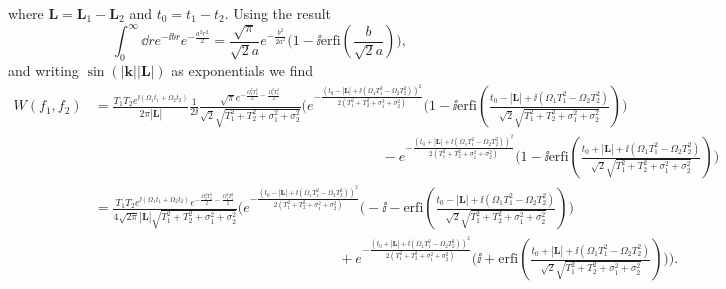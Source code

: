 where $\bm L = \bm L_1 - \bm L_2$ and $t_0 = t_1-t_2$. Using the result
\begin{equation}
    \int_0^\infty \dd r e^{- \ii b r}e^{- \frac{a^2r^2}{2}} = \frac{\sqrt{\pi}}{\sqrt{2}a}e^{- \frac{b^2}{2a^2}}\Big(1 - \ii \text{erfi}\left(\frac{b}{\sqrt{2}a}\right)\Big),
\end{equation}
and writing $\sin(|\bm k||\bm L|)$ as exponentials we find{\footnotesize
\begin{align}
     W(f_1,f_2) &= \frac{T_1T_2e^{\ii (\Omega_1 t_1+\Omega_2 t_2)}}{2\pi|\bm L|}  \frac{1}{2\ii}\frac{\sqrt{\pi}e^{- \frac{\Omega_2^2 T_2^2}{2} - \frac{\Omega_1^2 T_1^2}{2}}}{\sqrt{2} \sqrt{T_1^2 + T_2^2 + \sigma_1^2 + \sigma_2^2}}\Bigg(e^{- \frac{(t_0 - |\bm L|+\ii (\Omega_1 T_1^2- \Omega_2 T_2^2))^2}{2(T_1^2 + T_2^2 + \sigma_1^2 + \sigma_2^2)}}\Bigg(1 - \ii \text{erfi}\left(\tfrac{t_0 - |\bm L|+\ii (\Omega_1 T_1^2- \Omega_2 T_2^2)}{\sqrt{2}\sqrt{T_1^2 + T_2^2 + \sigma_1^2 + \sigma_2^2}}\right)\Bigg)\nonumber\\
     &\:\:\:\:\:\:\:\:\:\:\:\:\:\:\:\:\:\:\:\:\:\:\:\:\:\:\:\:\:\:\:\:\:\:\:\:\:\:\:\:\:\:\:\:\:\:\:\:\:\:\:\:\:\:\:\:\:\:\:\:\:\:\:\:\:\:\:\:\:\:\:\:\:\:\:\:\:\:\:\:\:\:\:\:\:\:\:\:\:\:\:\:\:-e^{- \frac{(t_0 + |\bm L|+\ii (\Omega_1 T_1^2- \Omega_2 T_2^2))^2}{2(T_1^2 + T_2^2 + \sigma_1^2 + \sigma_2^2)}}\Bigg(1 - \ii \text{erfi}\left(\tfrac{t_0 + |\bm L|+\ii (\Omega_1 T_1^2- \Omega_2 T_2^2)}{\sqrt{2}\sqrt{T_1^2 + T_2^2 + \sigma_1^2 + \sigma_2^2}}\right)\Bigg)\nonumber\\
     &= \frac{T_1T_2e^{\ii (\Omega_1 t_1+\Omega_2 t_2)}e^{- \frac{\Omega_2^2 T_2^2}{2} - \frac{\Omega_1^2 T_1^2}{2}}}{4\sqrt{2\pi}|\bm L|\sqrt{T_1^2 + T_2^2 + \sigma_1^2 + \sigma_2^2}} \Bigg(e^{- \frac{(t_0 - |\bm L|+\ii (\Omega_1 T_1^2- \Omega_2 T_2^2))^2}{2(T_1^2 + T_2^2 + \sigma_1^2 + \sigma_2^2)}}\Bigg(-\ii - \text{erfi}\left(\tfrac{t_0 - |\bm L|+\ii (\Omega_1 T_1^2- \Omega_2 T_2^2)}{\sqrt{2}\sqrt{T_1^2 + T_2^2 + \sigma_1^2 + \sigma_2^2}}\right)\Bigg)\nonumber\\
     &\:\:\:\:\:\:\:\:\:\:\:\:\:\:\:\:\:\:\:\:\:\:\:\:\:\:\:\:\:\:\:\:\:\:\:\:\:\:\:\:\:\:\:\:\:\:\:\:\:\:\:\:\:\:\:\:\:\:\:\:\:\:\:\:\:\:\:\:\:\:\:\:\:\:\:\:\:\:\:+e^{- \frac{(t_0 + |\bm L|+\ii (\Omega_1 T_1^2- \Omega_2 T_2^2))^2}{2(T_1^2 + T_2^2 + \sigma_1^2 + \sigma_2^2)}}\Bigg(\ii + \text{erfi}\left(\tfrac{t_0 + |\bm L|+\ii (\Omega_1 T_1^2- \Omega_2 T_2^2)}{\sqrt{2}\sqrt{T_1^2 + T_2^2 + \sigma_1^2 + \sigma_2^2}}\right)\Bigg)\Bigg).
\end{align}}
